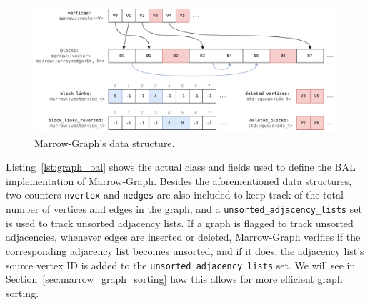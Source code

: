 

\begin{figure}[t]
  \centering
    \includegraphics[width=\textwidth]{Chapters/Figures/Images/marrow_graph_data_struct.png}
    \caption{Marrow-Graph's data structure.}
\label{fig:mg2_data_struct}
\end{figure}

Listing~\ref{lst:graph_bal} shows the actual class and fields used to define the \gls{BAL} implementation of Marrow-Graph. Besides the aforementioned data structures, two counters \texttt{nvertex} and \texttt{nedges} are also included to keep track of the total number of vertices and edges in the graph, and a \texttt{unsorted\_adjacency\_lists} set is used to track unsorted adjacency lists. If a graph is flagged to track unsorted adjacencies, whenever edges are inserted or deleted, Marrow-Graph verifies if the corresponding adjacency list becomes unsorted, and if it does, the adjacency list's source vertex ID is added to the \texttt{unsorted\_adjacency\_lists} set. We will see in Section~\ref{sec:marrow_graph_sorting} how this allows for more efficient graph sorting.

